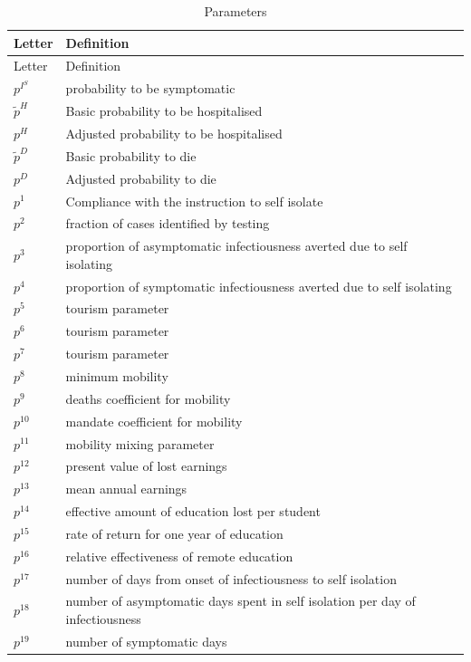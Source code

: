 \documentclass[
]{article}
\begin{document}
\begin{longtable}[]{@{}
  >{\centering\arraybackslash}p{}
  >{\centering\arraybackslash}p{}@{}}
\caption{Parameters}\tabularnewline
\toprule
Letter & Definition \\
\midrule
\endfirsthead
\toprule
Letter & Definition \\
\midrule
\endhead
\(p^{I^S}\) & probability to be symptomatic \\
\(\tilde{p}^H\) & Basic probability to be
hospitalised \\
\(p^H\) & Adjusted probability to be
hospitalised \\
\(\tilde{p}^D\) & Basic probability to die \\
\(p^D\) & Adjusted probability to die \\
\(p^1\) & Compliance with the
instruction to self isolate \\
\(p^2\) & fraction of cases identified
by testing \\
\(p^3\) & proportion of asymptomatic
infectiousness averted due to
self isolating \\
\(p^4\) & proportion of symptomatic
infectiousness averted due to
self isolating \\
\(p^5\) & tourism parameter \\
\(p^6\) & tourism parameter \\
\(p^7\) & tourism parameter \\
\(p^8\) & minimum mobility \\
\(p^9\) & deaths coefficient for
mobility \\
\(p^{10}\) & mandate coefficient for
mobility \\
\(p^{11}\) & mobility mixing parameter \\
\(p^{12}\) & present value of lost earnings \\
\(p^{13}\) & mean annual earnings \\
\(p^{14}\) & effective amount of education
lost per student \\
\(p^{15}\) & rate of return for one year of
education \\
\(p^{16}\) & relative effectiveness of
remote education \\
\(p^{17}\) & number of days from onset of
infectiousness to self
isolation \\
\(p^{18}\) & number of asymptomatic days
spent in self isolation per
day of infectiousness \\
\(p^{19}\) & number of symptomatic days

\end{longtable}
\end{document}
